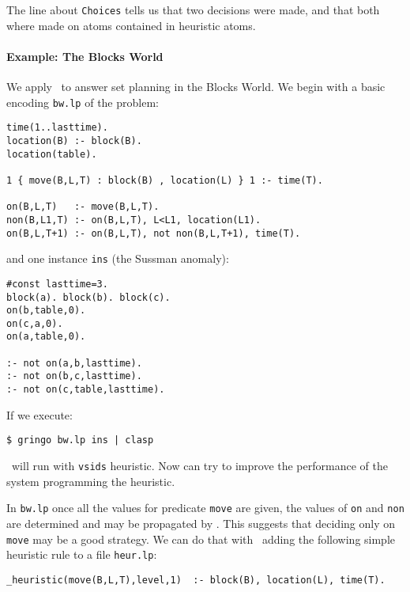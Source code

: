  The line about \texttt{Choices} tells us that  two decisions were made, and that both where made on atoms contained in heuristic atoms.


\paragraph{Example: The Blocks World}

 We apply \clasp\ to answer set planning in the Blocks World.  We begin with a basic encoding \texttt{bw.lp} of the problem:
\begin{lstlisting}[numbers=none]
time(1..lasttime).
location(B) :- block(B).
location(table).

1 { move(B,L,T) : block(B) , location(L) } 1 :- time(T).

on(B,L,T)   :- move(B,L,T).
non(B,L1,T) :- on(B,L,T), L<L1, location(L1).
on(B,L,T+1) :- on(B,L,T), not non(B,L,T+1), time(T). \end{lstlisting}

 and one instance \texttt{ins} (the Sussman anomaly):
\begin{lstlisting}[numbers=none]
#const lasttime=3.
block(a). block(b). block(c).
on(b,table,0).
on(c,a,0).
on(a,table,0).

:- not on(a,b,lasttime).
:- not on(b,c,lasttime).
:- not on(c,table,lasttime).
\end{lstlisting}

If we execute:
\begin{lstlisting}[numbers=none]
$ gringo bw.lp ins | clasp \end{lstlisting}

\clasp\ will run with \texttt{vsids} heuristic. Now can try to improve the performance of the system programming the heuristic.

 In \texttt{bw.lp} once all the values for predicate \texttt{move} are given,
 the values of \texttt{on} and \texttt{non} are determined and may be propagated by \clasp.
 This suggests that deciding only on \texttt{move} may be a good strategy.
 We can do that with \clasp\ adding the following simple heuristic rule to a file \texttt{heur.lp}:

\begin{lstlisting}[numbers=none]
_heuristic(move(B,L,T),level,1)  :- block(B), location(L), time(T).\end{lstlisting}

